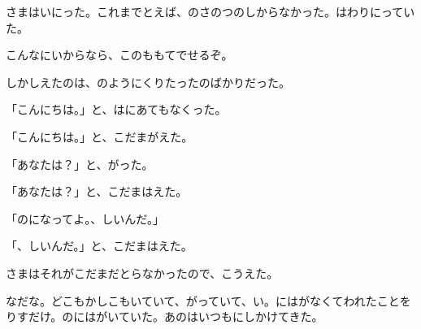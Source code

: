 さまはいにった。これまでとえば、のさのつのしからなかった。はわりにっていた。

こんなにいからなら、このももてでせるぞ。

しかしえたのは、のようにくりたったのばかりだった。

「こんにちは。」と、はにあてもなくった。

「こんにちは。」と、こだまがえた。

「あなたは？」と、がった。

「あなたは？」と、こだまはえた。

「のになってよ。、しいんだ。」

「、しいんだ。」と、こだまはえた。

さまはそれがこだまだとらなかったので、こうえた。

なだな。どこもかしこもいていて、がっていて、い。にはがなくてわれたことをりすだけ。のにはがいていた。あのはいつもにしかけてきた。


